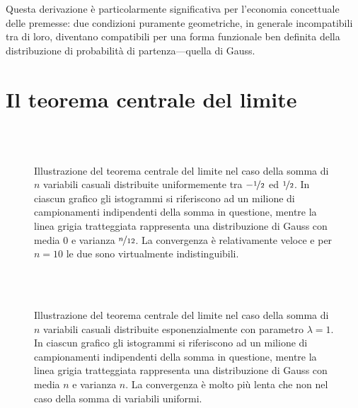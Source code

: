 Questa derivazione è particolarmente significativa per l'economia concettuale
delle premesse: due condizioni puramente geometriche, in generale incompatibili
tra di loro, diventano compatibili per una forma funzionale ben definita della
distribuzione di probabilità di partenza---quella di Gauss.


\section{Il teorema centrale del limite}
\label{sec:tcl}

\begin{figure}[htp!]
  \hfill%
  \\
  \hfill%
  \\
  \hfill%
  
  \caption{Illustrazione del teorema centrale del limite nel caso della somma
    di $n$ variabili casuali distribuite uniformemente tra $-\nicefrac{1}{2}$
    ed $\nicefrac{1}{2}$. In ciascun grafico gli istogrammi si riferiscono ad
    un milione di campionamenti indipendenti della somma in questione, mentre
    la linea grigia tratteggiata rappresenta una distribuzione di Gauss con
    media $0$ e varianza $\nicefrac{n}{12}$. La convergenza è relativamente
    veloce e per $n = 10$ le due sono virtualmente indistinguibili.}
  \label{fig:tcl_uniforme}
\end{figure}

\begin{figure}[htp!]
  \hfill%
  \\
  \hfill%
  \\
  \hfill
  \caption{Illustrazione del teorema centrale del limite nel caso della somma
    di $n$ variabili casuali distribuite esponenzialmente con parametro
    $\lambda = 1$. In ciascun grafico gli istogrammi si riferiscono ad
    un milione di campionamenti indipendenti della somma in questione, mentre
    la linea grigia tratteggiata rappresenta una distribuzione di Gauss con
    media $n$ e varianza $n$. La convergenza è molto più lenta che non nel
    caso della somma di variabili uniformi.}
  \label{fig:tcl_esponenziale}
\end{figure}

